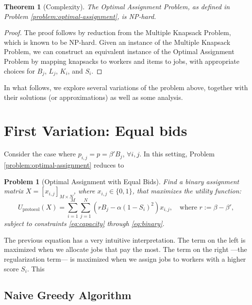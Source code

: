 \documentclass{article}
\newtheorem{problem}{Problem}
\newtheorem{theorem}{Theorem}
\begin{document}
\begin{theorem}[Complexity]
The Optimal Assignment Problem, as defined in Problem \ref{problem:optimal-assignment}, is NP-hard.
\end{theorem}
\begin{proof}
The proof follows by reduction from the Multiple Knapsack Problem, which is known to be NP-hard. Given an instance of the Multiple Knapsack Problem, we can construct an equivalent instance of the Optimal Assignment Problem by mapping knapsacks to workers and items to jobs, with appropriate choices for $B_j$, $L_j$, $K_i$, and $S_i$.
\end{proof}

In what follows, we explore several variations of the problem above, together with their solutions (or approximations) as well as some analysis.

\section{First Variation: Equal bids}

Consider the case where $p_{i,j}=p=\beta'B_j$, $\forall i,j$. In this setting, Problem \ref{problem:optimal-assignment} reduces to

\begin{problem}[Optimal Assignment with Equal Bids]\label{problem:equalBids-assignment}
Find a binary assignment matrix $X = [x_{i,j}]_{M \times N}$, where $x_{i,j} \in \{0, 1\}$, that maximizes the utility function:
\[
U_{\text{protocol}}(X) = \sum_{i=1}^M \sum_{j=1}^N \left( rB_j - \alpha (1 - S_i)^2 \right) x_{i,j}, \quad \text{where } r:=\beta-\beta',
\]
subject to constraints \eqref{eq:capacity} through \eqref{eq:binary}.
\end{problem}

The previous equation has a very intuitive interpretation. The term on the left is maximized when we allocate jobs that pay the most. The term on the right —the regularization term— is maximized when we assign jobs to workers with a higher score $S_i$. This 
\subsection{Naive Greedy Algorithm}
\end{document}
